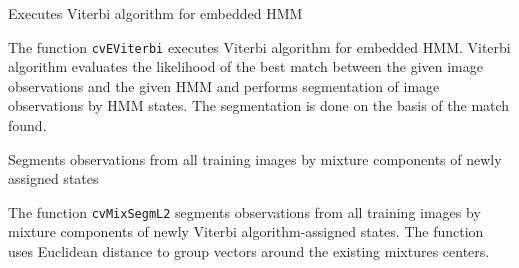 
Executes Viterbi algorithm for embedded HMM


\begin{description}
\end{description}

The function \texttt{cvEViterbi} executes Viterbi algorithm for embedded HMM. Viterbi algorithm evaluates the likelihood of the best match between the given image observations and the given HMM and performs segmentation of image observations by HMM states. The segmentation is done on the basis of the match found.


Segments observations from all training images by mixture components of newly assigned states


\begin{description}
\end{description}

The function \texttt{cvMixSegmL2} segments observations from all training images by mixture components of newly Viterbi algorithm-assigned states. The function uses Euclidean distance to group vectors around the existing mixtures centers.

